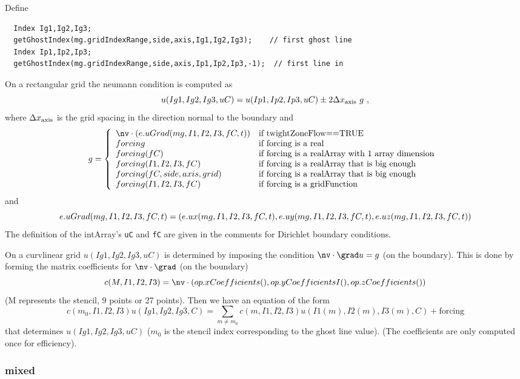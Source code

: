 Define
\begin{verbatim}
  Index Ig1,Ig2,Ig3;
  getGhostIndex(mg.gridIndexRange,side,axis,Ig1,Ig2,Ig3);    // first ghost line
  Index Ip1,Ip2,Ip3;
  getGhostIndex(mg.gridIndexRange,side,axis,Ip1,Ip2,Ip3,-1);  // first line in
\end{verbatim}

On a rectangular grid the neumann condition is computed as
\[
u(Ig1,Ig2,Ig3,uC) = u(Ip1,Ip2,Ip3,uC) \pm 2 \Delta x_{\rm axis} ~g ~,
\]
where $\Delta x_{\rm axis}$ is the grid spacing in the direction normal to the
boundary and
\[
g=  \left\{ \begin{array}{ll}
        \nv \cdot (\true uGrad(mg,I1,I2,I3,fC,t))    & \mbox{if twightZoneFlow==TRUE} \\
        forcing              & \mbox{if forcing is a real      } \\
        forcing(fC)           & \mbox{if forcing  is a realArray with 1 array dimension } \\
        forcing(I1,I2,I3,fC)  & \mbox{if forcing is a realArray that is big enough} \\
        forcing(fC,side,axis,grid) & \mbox{if forcing is a realArray that is big enough} \\
        forcing(I1,I2,I3,fC)  & \mbox{if forcing is a gridFunction} \\
          \end{array}
  \right.
\]
and 
\[
e. uGrad(mg,I1,I2,I3,fC,t)=(e. ux(mg,I1,I2,I3,fC,t),e. uy(mg,I1,I2,I3,fC,t),e. uz(mg,I1,I2,I3,fC,t))
\]
The definition of the intArray's {\tt uC} and {\tt fC} are given in the comments for Dirichlet boundary conditions.

On a curvlinear grid $u(Ig1,Ig2,Ig3,uC)$ is determined by imposing the
condition $\nv\cdot\grad u=g$ (on the boundary).
This is done by forming the matrix
coefficients for $\nv\cdot\grad$ (on the boundary)
\[
   c(M,I1,I2,I3) =  \nv \cdot (op.xCoefficients(),op.yCoefficientsI(),op.zCoefficients())
\]
(M represents the stencil, 9 points or 27 points).
Then we have an equation of the form
\[
    c(m_0,I1,I2,I3) u(Ig1,Ig2,Ig3,C) = \sum_{m\ne m_0} c(m,I1,I2,I3) u(I1(m),I2(m),I3(m),C) 
     + \mbox{forcing}
\]
that determines $u(Ig1,Ig2,Ig3,uC)$ ($m_0$ is the stencil index corresponding to the
ghost line value). (The coefficients are only computed once for efficiency).


\subsubsection{mixed}

